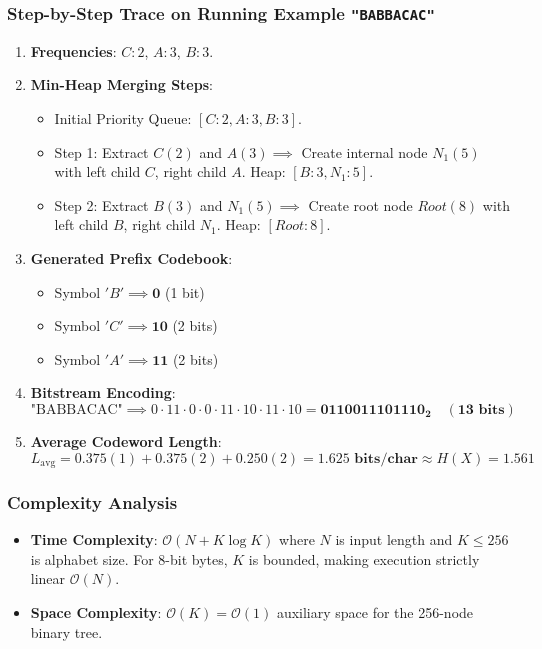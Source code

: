 \documentclass[12pt,a4paper]{article}
\begin{document}
\subsubsection{Step-by-Step Trace on Running Example \texttt{"BABBACAC"}}
\begin{enumerate}
    \item \textbf{Frequencies}: $C: 2$, $A: 3$, $B: 3$.
    \item \textbf{Min-Heap Merging Steps}:
    \begin{itemize}
        \item Initial Priority Queue: $[C:2, A:3, B:3]$.
        \item Step 1: Extract $C(2)$ and $A(3) \implies$ Create internal node $N_1(5)$ with left child $C$, right child $A$. Heap: $[B:3, N_1:5]$.
        \item Step 2: Extract $B(3)$ and $N_1(5) \implies$ Create root node $Root(8)$ with left child $B$, right child $N_1$. Heap: $[Root:8]$.
    \end{itemize}
    \item \textbf{Generated Prefix Codebook}:
    \begin{itemize}
        \item Symbol $'B' \implies \mathbf{0}$ (1 bit)
        \item Symbol $'C' \implies \mathbf{10}$ (2 bits)
        \item Symbol $'A' \implies \mathbf{11}$ (2 bits)
    \end{itemize}
    \item \textbf{Bitstream Encoding}:
    \begin{equation*}
    \text{"BABBACAC"} \implies 0 \cdot 11 \cdot 0 \cdot 0 \cdot 11 \cdot 10 \cdot 11 \cdot 10 = \mathbf{0110011101110_2} \quad (\mathbf{13\text{ bits}})
    \end{equation*}
    \item \textbf{Average Codeword Length}:
    \begin{equation*}
    L_{\text{avg}} = 0.375(1) + 0.375(2) + 0.250(2) = \mathbf{1.625\text{ bits/char}} \approx H(X) = 1.561
    \end{equation*}
\end{enumerate}

\subsubsection{Complexity Analysis}
\begin{itemize}
    \item \textbf{Time Complexity}: $\mathcal{O}(N + K \log K)$ where $N$ is input length and $K \le 256$ is alphabet size. For 8-bit bytes, $K$ is bounded, making execution strictly linear $\mathcal{O}(N)$.
    \item \textbf{Space Complexity}: $\mathcal{O}(K) = \mathcal{O}(1)$ auxiliary space for the 256-node binary tree.
\end{itemize}
\end{document}
